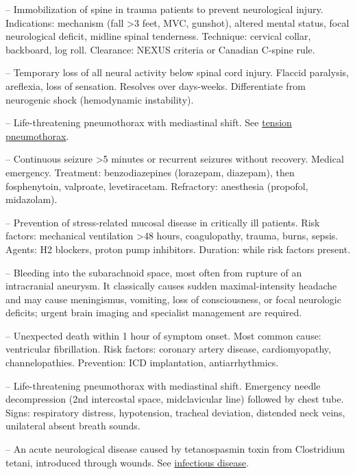 -- Immobilization of spine in trauma patients to prevent neurological injury. Indications: mechanism (fall >3 feet, MVC, gunshot), altered mental status, focal neurological deficit, midline spinal tenderness. Technique: cervical collar, backboard, log roll. Clearance: NEXUS criteria or Canadian C-spine rule.

-- Temporary loss of all neural activity below spinal cord injury. Flaccid paralysis, areflexia, loss of sensation. Resolves over days-weeks. Differentiate from neurogenic shock (hemodynamic instability).

-- Life-threatening pneumothorax with mediastinal shift. See \hyperlink{Tension Pneumothorax}{tension pneumothorax}.

-- Continuous seizure >5 minutes or recurrent seizures without recovery. Medical emergency. Treatment: benzodiazepines (lorazepam, diazepam), then fosphenytoin, valproate, levetiracetam. Refractory: anesthesia (propofol, midazolam).

-- Prevention of stress-related mucosal disease in critically ill patients. Risk factors: mechanical ventilation >48 hours, coagulopathy, trauma, burns, sepsis. Agents: H2 blockers, proton pump inhibitors. Duration: while risk factors present.

-- Bleeding into the subarachnoid space, most often from rupture of an intracranial aneurysm. It classically causes sudden maximal-intensity headache and may cause meningismus, vomiting, loss of consciousness, or focal neurologic deficits; urgent brain imaging and specialist management are required.

-- Unexpected death within 1 hour of symptom onset. Most common cause: ventricular fibrillation. Risk factors: coronary artery disease, cardiomyopathy, channelopathies. Prevention: ICD implantation, antiarrhythmics.

-- Life-threatening pneumothorax with mediastinal shift. Emergency needle decompression (2nd intercostal space, midclavicular line) followed by chest tube. Signs: respiratory distress, hypotension, tracheal deviation, distended neck veins, unilateral absent breath sounds.

-- An acute neurological disease caused by tetanospasmin toxin from Clostridium tetani, introduced through wounds. See \hyperlink{Infectious Disease}{infectious disease}.

